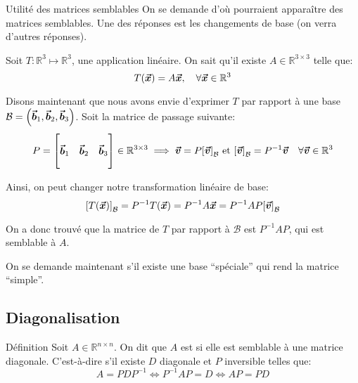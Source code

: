 \documentclass[a4paper]{article}
\begin{document}
\begin{parag}{Utilité des matrices semblables}
    On se demande d'où pourraient apparaître des matrices semblables. Une des réponses est les changements de base (on verra d'autres réponses).

    Soit $T : \mathbb{R}^3 \mapsto \mathbb{R}^3$, une application linéaire. On sait qu'il existe $A \in \mathbb{R}^{3 \times 3}$ telle que: 
    \[T\left(\bvec{x}\right) = A \bvec{x}, \mathspace \forall \bvec{x} \in \mathbb{R}^3\]
    
    Disons maintenant que nous avons envie d'exprimer $T$ par rapport à une base $\mathcal{B} = \left(\bvec{b}_1, \bvec{b}_2, \bvec{b}_3\right)$. Soit la matrice de passage suivante: 
    \[P = \begin{bmatrix}  &  &  \\ \bvec{b}_1 & \bvec{b}_2 & \bvec{b}_3 \\  &  &  \end{bmatrix} \in \mathbb{R}^{3\times 3} \implies \bvec{v} = P\left[\bvec{v}\right]_{\mathcal{B}} \text{ et } \left[\bvec{v}\right]_{\mathcal{B}} = P^{-1} \bvec{v} \mathspace \forall \bvec{v} \in \mathbb{R}^3\]

    Ainsi, on peut changer notre transformation linéaire de base:
    \[\left[T\left(\bvec{x}\right)\right]_{\mathcal{B}} = P^{-1} T\left(\bvec{x}\right) = P^{-1}A \bvec{x} = P^{-1}AP \left[\bvec{v}\right]_{\mathcal{B}}\]

    On a donc trouvé que la matrice de $T$ par rapport à $\mathcal{B}$ est $P^{-1}AP$, qui est semblable à $A$.

    On se demande maintenant s'il existe une base ``spéciale'' qui rend la matrice ``simple''.
\end{parag}

\subsection{Diagonalisation}
\begin{parag}{Définition}
    Soit $A \in \mathbb{R}^{n\times n}$. On dit que $A$ est  si elle est semblable à une matrice diagonale. C'est-à-dire s'il existe $D$ diagonale et $P$ inversible telles que: 
    \[A = PDP^{-1} \iff P^{-1} A P = D \iff AP = PD\]
\end{parag}
\end{document}
